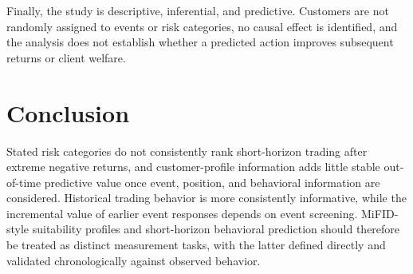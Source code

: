 \documentclass[conference]{IEEEtran}
\begin{document}
Finally, the study is descriptive, inferential, and predictive. Customers are not randomly assigned to events or risk categories, no causal effect is identified, and the analysis does not establish whether a predicted action improves subsequent returns or client welfare.

\section{Conclusion}
Stated risk categories do not consistently rank short-horizon trading after extreme negative returns, and customer-profile information adds little stable out-of-time predictive value once event, position, and behavioral information are considered. Historical trading behavior is more consistently informative, while the incremental value of earlier event responses depends on event screening. MiFID-style suitability profiles and short-horizon behavioral prediction should therefore be treated as distinct measurement tasks, with the latter defined directly and validated chronologically against observed behavior.

\balance


\end{document}
